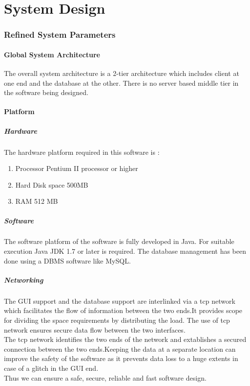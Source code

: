 \documentclass{article}
\begin{document}
\part{System Design}
\section{Refined System Parameters}
\subsection{Global System Architecture}
The overall system architecture is a 2-tier architecture which includes client at one end and the
database at the other. There is no server based middle tier in the software being designed.
\subsection{Platform}
\subsubsection{Hardware}
The hardware platform required in this software is :
\begin {enumerate}
	\item Processor Pentium II processor or higher
	\item Hard Disk space 500MB
	\item RAM 512 MB
	\end{enumerate}
\subsubsection{Software}
The software platform of the software is fully developed in Java.
For suitable execution Java JDK 1.7 or later is required.
The database management has been done using a DBMS software like MySQL.

\subsubsection{Networking}
The GUI support and the database support are interlinked via a tcp network which facilitates the flow of information between the two ends.It provides scope for dividing the space requirements by distributing the load. The use of tcp network ensures secure data flow between the two interfaces.\\
The tcp network identifies the two ends of the network and extablishes a secured connection between the two ends.Keeping the data at a separate location can improve the safety of the software as it prevents data loss to a huge extents in case of a glitch in the GUI end.
\\
Thus we can ensure a safe, secure, reliable and fast software design.
\end{document}
